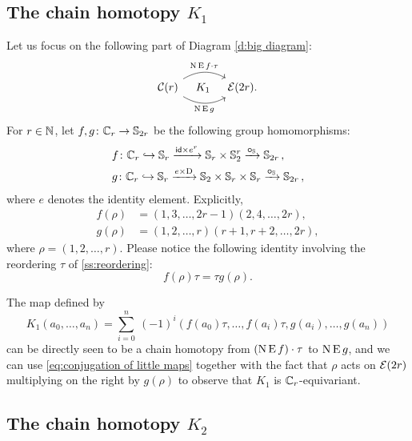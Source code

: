 \subsection{The chain homotopy $K_1$}\label{ss:K1}

Let us focus on the following part of Diagram \eqref{d:big diagram}:
\[
\begin{tikzcd}[column sep=large]
	\cC(r)
	\arrow[r,bend left,"\chains\EE f \cdot \tau"]
	\arrow[r,bend right,"\chains\EE g"']
	\arrow[r,phantom,"K_1"]
	& \BE(2r).
\end{tikzcd}
\]
For $r \in \mathbb{N}$, let $f,g \colon \mathbb{C}_r \to \mathbb{S}_{2r}$ be the following group homomorphisms:
\[
\begin{split}
	&f \colon \mathbb{C}_r \hookrightarrow \mathbb{S}_r \xrightarrow{\mathsf{id} \times e^r} \mathbb{S}_r \times \mathbb{S}_2^r \xrightarrow{\bm{\circ}_{\mathbb{S}}} \mathbb{S}_{2r}\,, \\
	&g \colon \mathbb{C}_r \hookrightarrow \mathbb{S}_r \xrightarrow{e \times \mathrm{D}} \mathbb{S}_2 \times \mathbb{S}_r \times \mathbb{S}_r \xrightarrow{\bm{\circ}_{\mathbb{S}}} \mathbb{S}_{2r}\,,
\end{split}
\]
where $e$ denotes the identity element.
Explicitly,
\begin{align*}
	f(\rho) &= (1,3,\dots,2r-1)(2,4,\dots,2r), \\
	g(\rho) &= (1,2,\dots,r)(r+1,r+2,\dots,2r),
\end{align*}
where $\rho = (1,2,\dots,r)$.
Please notice the following identity involving the reordering $\tau$ of \cref{ss:reordering}:
\begin{equation}\label{eq:conjugation of little maps}
	f(\rho) \tau = \tau g(\rho).
\end{equation}

The map defined by
\[
K_1(a_0,\dots,a_n) =
\sum_{i=0}^n \ (-1)^i (f(a_0) \tau, \dots, f(a_i) \tau, g(a_i), \dots, g(a_n))
\]
can be directly seen to be a chain homotopy from $(\operatorname{N} \operatorname{E} f) \cdot \tau$ to $\operatorname{N} \operatorname{E} g$, and we can use \cref{eq:conjugation of little maps} together with the fact that $\rho$ acts on $\mathcal{E}(2r)$ multiplying on the right by $g(\rho)$ to observe that $K_1$ is $\mathbb{C}_r$-equivariant.

\subsection{The chain homotopy $K_2$}

